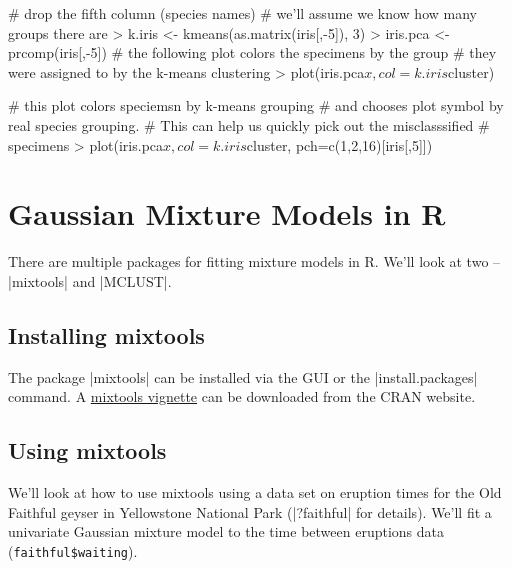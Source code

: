 \begin{R}
# drop the fifth column (species names)
# we'll assume we know how many groups there are    
> k.iris <- kmeans(as.matrix(iris[,-5]), 3)    
> iris.pca <- prcomp(iris[,-5])
# the following plot colors the specimens by the group
# they were assigned to by the k-means clustering
> plot(iris.pca$x,col=k.iris$cluster)

# this plot colors speciemsn by k-means grouping
# and chooses plot symbol by real species grouping.
# This can help us quickly pick out the misclasssified
# specimens
> plot(iris.pca$x, col=k.iris$cluster, pch=c(1,2,16)[iris[,5]])
\end{R}


\section{Gaussian Mixture Models in R}

There are multiple packages for fitting mixture models in R.  We'll look at two -- |mixtools| and |MCLUST|.

\subsection{Installing mixtools}

The package |mixtools| can be installed via the GUI or the |install.packages| command. A \href{http://cran.r-project.org/web/packages/mixtools/vignettes/vignette.pdf}{mixtools vignette} can be downloaded from the CRAN website.

\subsection{Using mixtools}

We'll look at how to use mixtools using a data set on eruption times for the Old Faithful geyser in Yellowstone National Park (|?faithful| for details). We'll fit a univariate Gaussian mixture model to the time between eruptions data (\verb|faithful$waiting|).



